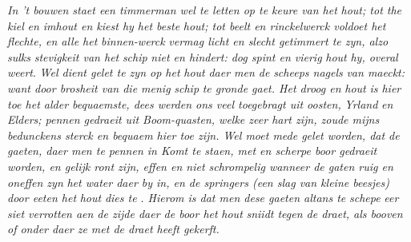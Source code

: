 \pend 
 \pstart \textit{In 't bouwen staet een timmerman wel te letten op te keure van het }\textit{hout}\protect{}\textit{; tot the }\textit{kiel}\protect{}\textit{ en imhout en kiest hy het beste }\textit{hout}\protect{}\textit{; tot beelt en rinckelwerck voldoet het flechte, en alle het }\textit{binnen-werck}\protect{}\textit{ vermag licht en slecht getimmert te zyn, alzo sulks }\textit{ stevigkeit van het }\textit{schip}\protect{}\textit{ niet en hindert: dog spint en vierig }\textit{hout}\protect{}\textit{ hy, overal weert}. 
 \pend 
 \pstart \textit{Wel dient gelet te zyn op het }\textit{hout}\protect{}\textit{ daer men de }\textit{scheeps nagels}\protect{}\textit{ van maeckt: want door brosheit van die menig }\textit{schip}\protect{}\textit{ te gronde gaet. Het droog en }\textit{ }\textit{hout}\protect{}\textit{ is hier toe het alder bequaemste, dees werden ons veel toegebragt uit oosten, }\textit{Yrland}\protect{}\textit{ en Elders; pennen gedraeit uit Boom-quasten, welke zeer hart zijn, zoude mijns bedunckens sterck en bequaem hier toe zijn. Wel moet mede gelet worden, dat de gaeten, daer men te pennen in Komt te staen, met en scherpe boor gedraeit worden, en gelijk ront zijn, effen en niet schrompelig wanneer de gaten ruig en oneffen zyn }\textit{ het water daer by in, en de springers (een slag van kleine beesjes) door eeten het }\textit{hout}\protect{}\textit{ dies te }\textit{. Hierom is dat men dese gaeten altans te }\textit{schepe}\protect{}\textit{ eer siet verrotten aen de zijde daer de boor het }\textit{hout}\protect{}\textit{ sniidt tegen de draet, als booven of onder daer ze met de draet heeft gekerft. }
 \pend 
